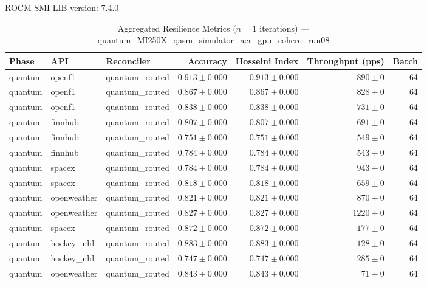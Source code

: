 ROCM-SMI-LIB version: 7.4.0

\begin{table}[htbp]
\caption{Aggregated Resilience Metrics ($n=1$ iterations) --- quantum_MI250X_qasm_simulator_aer_gpu_cohere_run08}
\begin{tabular}{l l l r r r r}
\hline
Phase & API & Reconciler & Accuracy & Hosseini Index & Throughput (pps) & Batch \\
\hline
quantum & openf1 & quantum\_routed & $0.913\pm0.000$ & $0.913\pm0.000$ & $890\pm0$ & 64 \\
quantum & openf1 & quantum\_routed & $0.867\pm0.000$ & $0.867\pm0.000$ & $828\pm0$ & 64 \\
quantum & openf1 & quantum\_routed & $0.838\pm0.000$ & $0.838\pm0.000$ & $731\pm0$ & 64 \\
quantum & finnhub & quantum\_routed & $0.807\pm0.000$ & $0.807\pm0.000$ & $691\pm0$ & 64 \\
quantum & finnhub & quantum\_routed & $0.751\pm0.000$ & $0.751\pm0.000$ & $549\pm0$ & 64 \\
quantum & finnhub & quantum\_routed & $0.784\pm0.000$ & $0.784\pm0.000$ & $543\pm0$ & 64 \\
quantum & spacex & quantum\_routed & $0.784\pm0.000$ & $0.784\pm0.000$ & $943\pm0$ & 64 \\
quantum & spacex & quantum\_routed & $0.818\pm0.000$ & $0.818\pm0.000$ & $659\pm0$ & 64 \\
quantum & openweather & quantum\_routed & $0.821\pm0.000$ & $0.821\pm0.000$ & $870\pm0$ & 64 \\
quantum & openweather & quantum\_routed & $0.827\pm0.000$ & $0.827\pm0.000$ & $1220\pm0$ & 64 \\
quantum & spacex & quantum\_routed & $0.872\pm0.000$ & $0.872\pm0.000$ & $177\pm0$ & 64 \\
quantum & hockey\_nhl & quantum\_routed & $0.883\pm0.000$ & $0.883\pm0.000$ & $128\pm0$ & 64 \\
quantum & hockey\_nhl & quantum\_routed & $0.747\pm0.000$ & $0.747\pm0.000$ & $285\pm0$ & 64 \\
quantum & openweather & quantum\_routed & $0.843\pm0.000$ & $0.843\pm0.000$ & $71\pm0$ & 64 \\

\end{tabular}
\end{table}
